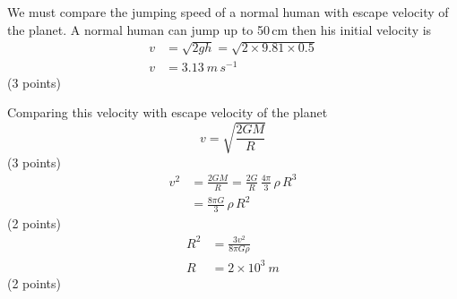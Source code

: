 We must compare the jumping speed of a normal human with escape velocity of
the planet. A normal human can jump up to 50\,cm then his initial velocity is
\begin{align*}
  v &= \sqrt{2gh} = \sqrt{2\times 9.81\times 0.5} \\
  v &= 3.13\ m\,s^{-1}
\end{align*}
\hfill(3 points)

Comparing this velocity with escape velocity of the planet
\[
  v = \sqrt{\frac{2GM}{R}}
\]
\hfill(3 points)
\begin{align*}
  v^2 &= \frac{2GM}{R} = \frac{2G}{R}\,\frac{4\pi}{3}\,\rho\,R^3 \\
      &= \frac{8\pi G}{3}\,\rho\,R^2
\end{align*}
\hfill(2 points)
\begin{align*}
  R^2 &= \frac{3v^2}{8\pi G\rho} \\
  R &= 2\times 10^{3}\ m
\end{align*}
\hfill(2 points)
